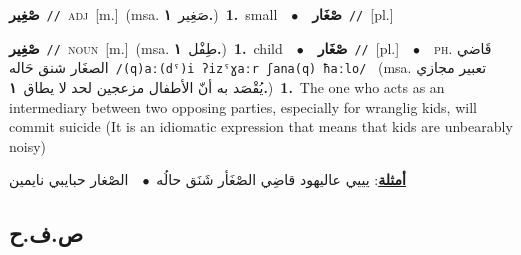 \documentclass[10pt,a4paper,twoside]{article} %
\begin{document}
\begin{multicols}{2}
{\setlength\topsep{0pt}\textbf{\foreignlanguage{arabic}{صْغِير}}\ {\color{gray}\texttt{//}\color{black}}\ \textsc{adj}\ [m.]\ \color{gray}(msa. \foreignlanguage{arabic}{صَغِير}~\foreignlanguage{arabic}{\textbf{١.}})\color{black}\ \textbf{1.}~small\ \ $\bullet$\ \ \setlength\topsep{0pt}\textbf{\foreignlanguage{arabic}{صْغَار}}\ {\color{gray}\texttt{//}\color{black}}\ [pl.]\ } \vspace{2mm}

{\setlength\topsep{0pt}\textbf{\foreignlanguage{arabic}{صْغِير}}\ {\color{gray}\texttt{//}\color{black}}\ \textsc{noun}\ [m.]\ \color{gray}(msa. \foreignlanguage{arabic}{طِفْل}~\foreignlanguage{arabic}{\textbf{١.}})\color{black}\ \textbf{1.}~child\ \ $\bullet$\ \ \setlength\topsep{0pt}\textbf{\foreignlanguage{arabic}{صْغَار}}\ {\color{gray}\texttt{//}\color{black}}\ [pl.]\ \ $\bullet$\ \ \textsc{ph.} \color{gray} \foreignlanguage{arabic}{قَاضي الصغَار شنق حَاله}\color{black}\ {\color{gray}\texttt{/{\sffamily (q)aː(dˤ)i ʔizˤɣaːr ʃana(q) ħaːlo}/}\color{black}}\ \color{gray} (msa. \foreignlanguage{arabic}{تعبير مجازي يُقْصَد به أنّ الأطفال مزعجين لحد لا يطاق}~\foreignlanguage{arabic}{\textbf{١.}})\color{black}\ \textbf{1.}~The one who acts as an intermediary between two opposing parties, especially for wranglig kids, will commit suicide (It is an idiomatic expression that means that kids are unbearably noisy)\  \begin{flushright}\color{gray}\foreignlanguage{arabic}{\textbf{\underline{\foreignlanguage{arabic}{أمثلة}}}: يييي عاليهود قاضِي الصْغَأر شَنَق حالُه\ $\bullet$\ \  الصْغار حبايبي نايمين}\end{flushright}\color{black}} \vspace{2mm}

\vspace{-3mm}
\subsection*{\color{blue}\foreignlanguage{arabic}{ص.ف.ح}\color{blue}{}} 


\end{multicols}
\end{document}
